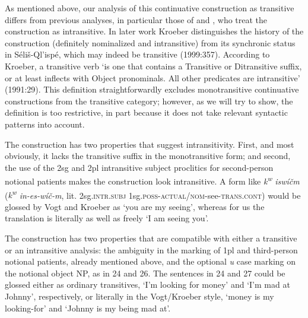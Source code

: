 \documentclass[output=paper,colorlinks,citecolor=brown]{langscibook}
\begin{document}
As mentioned above, our analysis of this continuative construction as
transitive differs from previous analyses, in particular those of
\cite{Kroeber:1991} and \cite{Vogt:1940}, who treat the construction
as intransitive.  In later work Kroeber distinguishes the history of
the construction (definitely nominalized and intransitive) from its
synchronic status in S\'eli\v{s}-Ql'isp\'e, which may indeed be
transitive (1999:357).  According to Kroeber, a transitive verb `is
one that contains a Transitive or Ditransitive suffix, or at least
inflects with Object pronominals.  All other predicates are
intransitive' (1991:29).  This definition straightforwardly excludes
monotransitive continuative constructions from the transitive
category; however, as we will try to show, the definition is too
restrictive, in part because it does not take relevant syntactic
patterns into account.


The construction has two properties that suggest intransitivity.
First, and most obviously, it lacks the transitive suffix in the
monotransitive form; and second, the use of the 2sg and 2pl
intransitive subject proclitics for second-person notional patients
makes the construction look intransitive.  A form like
\emph{{k\textsuperscript w} isw\'i\v{c}m} (\emph{{k\textsuperscript w}
in-es-w\'i\v{c}-m}, lit. 2sg.\textsc{intr.subj} 1sg.\textsc{poss}-\textsc{actual/nom}-see-\textsc{trans.cont}) would be glossed by Vogt and
Kroeber as `you are my seeing', whereas for us the translation is
literally as well as freely `I am seeing you'.

The construction has two properties that are compatible with
either a transitive or an intransitive analysis: the ambiguity in the
marking of 1pl and third-person notional patients, already mentioned
above, and the optional \emph{{\textltilde}u} case marking on the notional
object NP, as in 24 and 26.  The sentences in 24 and 27 could be
glossed either as ordinary transitives, `I'm looking for money' and
`I'm mad at Johnny', respectively, or literally in the Vogt/Kroeber
style, `money is my looking-for' and `Johnny is my being mad at'.
\end{document}
